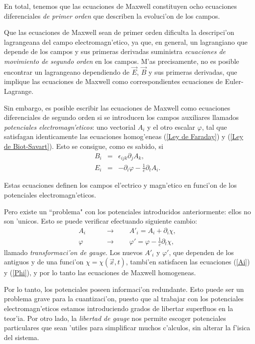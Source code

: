En total, tenemos que las ecuaciones de Maxwell constituyen ocho ecuaciones
diferenciales \textit{de primer orden} que describen la evoluci'on de los
campos.

Que las ecuaciones de Maxwell sean de primer orden dificulta la descripci'on
lagrangeana del campo electromagn'etico, ya que, en general, un lagrangiano que
depende de los campos y sus primeras derivadas suministra \textit{ecuaciones de
movimiento de segundo orden} en los campos. M'as precisamente, no es posible
encontrar un lagrangeano dependiendo de $\vec{E}$, $\vec{B}$ y sus primeras
derivadas, que implique las ecuaciones de Maxwell como correspondientes
ecuaciones de Euler-Lagrange.

Sin embargo, es posible escribir las ecuaciones de Maxwell como ecuaciones
diferenciales de segundo orden si se introducen los campos auxiliares llamados
\textit{potenciales electromagn'eticos}: uno vectorial $A_{i}$ y el otro escalar
$\varphi$, tal que satisfagan identicamente las ecuaciones homog'eneas
(\ref{Ley de Faraday}) y (\ref{Ley de Biot-Savart}). Esto se consigue, como es
sabido, si
\begin{eqnarray}
B_{i} & = &\epsilon_{ijk}\partial_{j}A_{k}\label{Ai} ,\\
E_{i} & = &-\partial_{i}\varphi-\frac{1}{c}\partial_{t}A_{i} .\label{Phi}
\end{eqnarray}

Estas ecuaciones definen los campos el'ectrico y magn'etico en
funci'on de los potenciales electromagn'eticos.

Pero existe un ``problema" con los potenciales introducidos anteriormente: ellos
no son 'unicos. Esto se puede verificar efectuando siguiente cambio:
\begin{eqnarray}
A_{i}\qquad & \rightarrow\qquad A'_{i}=A_{i}+\partial_{i}\chi ,\label{Ai de
Gauge}\\
\varphi\qquad & \rightarrow\qquad\varphi'=\varphi-\frac{1}{c}\partial_{t}\chi
,\label{Phi de Gauge}
\end{eqnarray}
llamado \textit{transformaci'on de gauge}. Los nuevos $A'_{i}$ y $\varphi'$, que
dependen de los antiguos y de una funci'on $\chi=\chi\left( \vec{x},t\right)$,
tambi'en satisfacen las ecuaciones (\ref{Ai}) y  (\ref{Phi}), y por lo tanto las
ecuaciones de Maxwell homogeneas.

Por lo tanto, los potenciales poseen informaci'on redundante. Esto puede ser un
problema grave para la cuantizaci'on, puesto que al trabajar con los potenciales
electromagn'eticos estamos introduciendo grados de libertar superfluos en la
teor'ia. Por otro lado, la \textit{libertad de gauge} nos permite escoger
potenciales particulares que sean 'utiles para simplificar muchos c'alculos, sin
alterar la f'isica del sistema.

